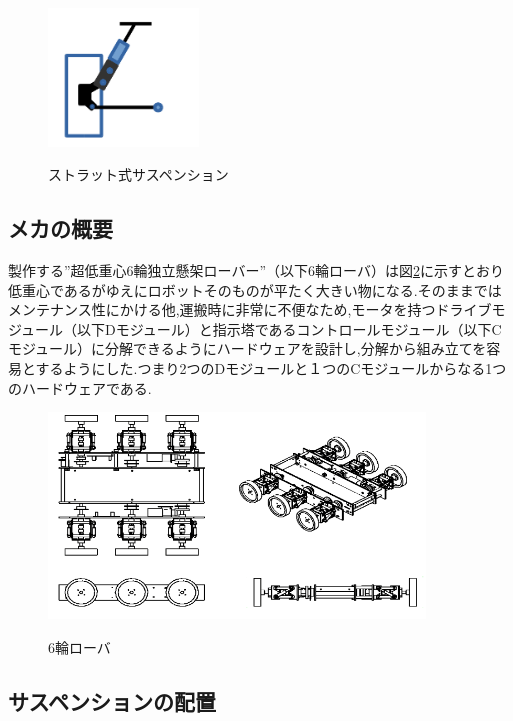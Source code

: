 \documentclass[12pt,oneside]{sotsuken_paper}
\begin{document}
\begin{figure}[htp] 
 \begin{center} 
  \includegraphics[width=40mm]{img/hard/fig2.png} 
 　\caption{ストラット式サスペンション} 
  \label{fig:strat}%
 \end{center} 
\end{figure} 

\subsection{メカの概要} 

製作する”超低重心6輪独立懸架ローバー”（以下6輪ローバ）は図\ref{fig:rokurin}に示すとおり低重心であるがゆえにロボットそのものが平たく大きい物になる.そのままではメンテナンス性にかける他,運搬時に非常に不便なため,モータを持つドライブモジュール（以下Dモジュール）と指示塔であるコントロールモジュール（以下Cモジュール）に分解できるようにハードウェアを設計し,分解から組み立てを容易とするようにした.つまり2つのDモジュールと１つのCモジュールからなる1つのハードウェアである. 

\begin{figure}[htp] 
 \begin{center} 
  \includegraphics[width=100mm]{img/hard/fig3.png} 
 　\caption{6輪ローバ} 
  \label{fig:rokurin}%
 \end{center} 
\end{figure} 

\subsection{サスペンションの配置} 
\end{document}
